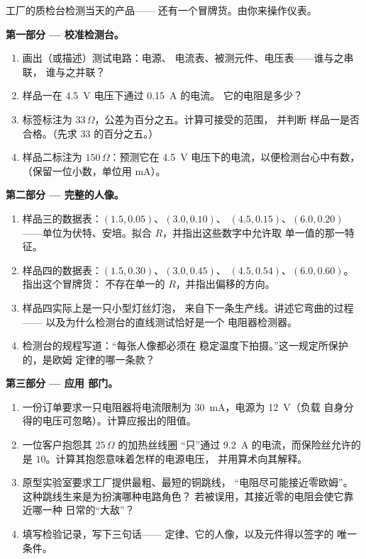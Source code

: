 \begin{problem}\label{pb:g8:ohms-law:1}
工厂的质检台检测当天的产品——
还有一个冒牌货。由你来操作仪表。

\medskip\noindent\textbf{第一部分 --- 校准检测台。}
\begin{enumerate}
  \item 画出（或描述）测试电路：电源、
        电流表、被测元件、电压表——谁与之串联，
        谁与之并联？
  \item 样品一在 \qty{4.5}{V} 电压下通过 \qty{0.15}{A} 的电流。
        它的电阻是多少？
  \item 标签标注为 $33\,\Omega$，公差为百分之五。计算可接受的范围，
        并判断
        样品一是否合格。（先求 $33$ 的百分之五。）
  \item 样品二标注为 $150\,\Omega$：预测它在
        \qty{4.5}{V} 电压下的电流，以便检测台心中有数，
        （保留一位小数，单位用 \unit{mA}）。
\end{enumerate}

\medskip\noindent\textbf{第二部分 --- 完整的人像。}
\begin{enumerate}[resume]
  \item 样品三的数据表：$(1.5, 0.05)$、$(3.0, 0.10)$、
        $(4.5, 0.15)$、$(6.0, 0.20)$——单位为伏特、安培。拟合
        $R$，并指出这些数字中允许取
        单一值的那一特征。
  \item 样品四的数据表：$(1.5, 0.30)$、$(3.0, 0.45)$、
        $(4.5, 0.54)$、$(6.0, 0.60)$。指出这个冒牌货：
        不存在单一的 $R$，并指出偏移的方向。
  \item 样品四实际上是一只小型灯丝灯泡，
        来自下一条生产线。讲述它弯曲的过程——
        以及为什么检测台的直线测试恰好是一个
        电阻器检测器。
  \item 检测台的规程写道：“每张人像都必须在
        稳定温度下拍摄。”这一规定所保护的，是欧姆
        定律的哪一条款？
\end{enumerate}

\medskip\noindent\textbf{第三部分 --- 应用
部门。}
\begin{enumerate}[resume]
  \item 一份订单要求一只电阻器将电流限制为
        \qty{30}{mA}，电源为 \qty{12}{V}（负载
        自身分得的电压可忽略）。计算应报出的阻值。
  \item 一位客户抱怨其 $25\,\Omega$ 的加热丝线圈
        “只”通过 \qty{9.2}{A} 的电流，而保险丝允许的是
        $10$。计算其抱怨意味着怎样的电源电压，
        并用算术向其解释。
  \item 原型实验室要求工厂提供最粗、最短的铜跳线，
        “电阻尽可能接近零欧姆”。
        这种跳线生来是为扮演哪种电路角色？
        若被误用，其接近零的电阻会使它靠近哪一种
        日常的“大敌”？
  \item 填写检验记录，写下三句话——
        定律、它的人像，以及元件得以签字的
        唯一条件。
\end{enumerate}
\end{problem}

